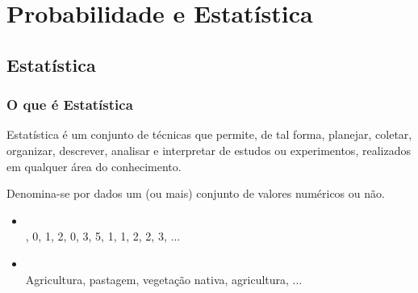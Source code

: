 \documentclass[11pt,fleqn]{book}
\numberwithin{mpicture}{chapter}
\numberwithin{mtable}{chapter}
\numberwithin{mframe}{chapter}
\begin{document}



\pagestyle{empty} %

\tableofcontents %

\cleardoublepage %

\pagestyle{fancy} %


\part{Probabilidade e Estatística}

\opensidepicturearea
\chapter{Estatística}
    
\section{O que é Estatística}

Estatística é um conjunto de técnicas que permite, de tal forma, planejar, coletar, organizar, descrever, analisar e interpretar  de estudos ou experimentos, realizados em qualquer área do conhecimento.

Denomina-se por dados um (ou mais) conjunto de valores numéricos ou não.

\begin{example}\hfill
	\begin{itemize}
		\item {}\\
		, 0, 1, 2, 0, 3, 5, 1, 1, 2, 2, 3, $\dots$
		
		\item {}\\
		\noindent Agricultura, pastagem, vegetação nativa, agricultura, $\dots$
	\end{itemize}
\end{example}
	
\end{document}
